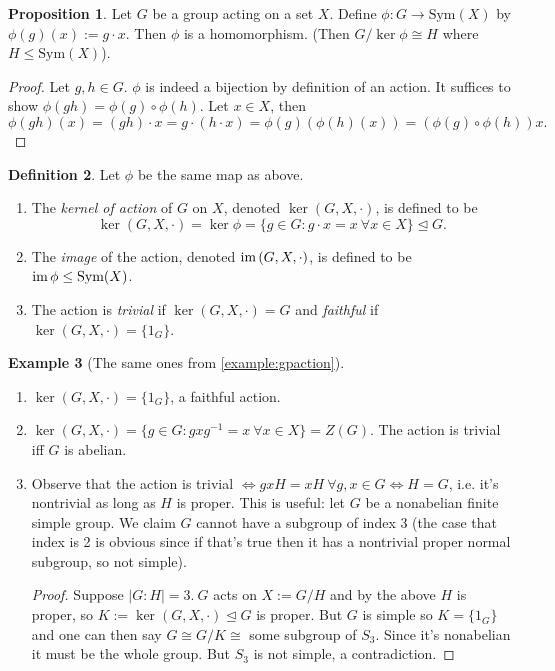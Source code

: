 \documentclass[a4paper]{article}
\newcommand{\Sym}{\text{Sym}}
\newcommand{\im}{\text{im\,}}
\theoremstyle{definition}
\newtheorem{defn}{Definition}[subsection]
\newtheorem{prop}[defn]{Proposition}
\newtheorem{example}[defn]{Example}
\begin{document}
\begin{prop}
\label{prop:GhomSymX}
Let $G$ be a group acting on a set $X$. Define $\phi:G\rightarrow\Sym(X)$ by $\phi(g)(x):=g\cdot x$. Then $\phi$ is a homomorphism. (Then $G/\ker\phi\cong H$ where $H\leq \Sym(X)$).
\end{prop}
\begin{proof}
Let $g,h\in G$. $\phi$ is indeed a bijection by definition of an action. It suffices to show $\phi(gh)=\phi(g)\circ\phi(h)$. Let $x\in X$, then
\[
\phi(gh)(x)=(gh)\cdot x = g\cdot(h\cdot x)=\phi(g)(\phi(h)(x))=(\phi(g)\circ\phi(h))x.
\]
\end{proof}

\begin{defn}
Let $\phi$ be the same map as above.
\begin{enumerate}
\item The \textit{kernel of action} of $G$ on $X$, denoted $\ker(G,X,\cdot)$, is defined to be
\[
\ker(G,X,\cdot)=\ker\phi=\{g\in G:g\cdot x=x \ \forall x\in X\} \unlhd G.
\]
\item The \textit{image} of the action, denoted $\im(G,X,\cdot)$, is defined to be $\im\phi\leq\Sym(X)$.
\item The action is \textit{trivial} if $\ker(G,X,\cdot)=G$ and \textit{faithful} if $\ker(G,X,\cdot)=\{1_G\}$.
\end{enumerate}
\end{defn}

\begin{example}[The same ones from \ref{example:gpaction}]
\begin{enumerate}
\item $\ker(G,X,\cdot)=\{1_G\}$, a faithful action.
\item $\ker(G,X,\cdot)=\{g\in G:gxg^{-1}=x \ \forall x\in X\}=Z(G)$. The action is trivial iff $G$ is abelian.
\item Observe that the action is trivial $\Leftrightarrow gxH=xH \ \forall g,x\in G\Leftrightarrow H=G$, i.e. it's nontrivial as long as $H$ is proper. This is useful: let $G$ be a nonabelian finite simple group. We claim $G$ cannot have a subgroup of index 3 (the case that index is 2 is obvious since if that's true then it has a nontrivial proper normal subgroup, so not simple).
\begin{proof}
Suppose $|G:H|=3.\ G$ acts on $X:=G/H$ and by the above $H$ is proper, so $K:=\ker(G,X,\cdot) \unlhd G$ is proper. But $G$ is simple so $K=\{1_G\}$ and one can then say $G\cong G/K\cong$ some subgroup of $S_3$. Since it's nonabelian it must be the whole group. But $S_3$ is not simple, a contradiction. 
\end{proof}
\end{enumerate}
\end{example}
\end{document}
